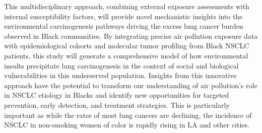 This multidisciplinary approach, combining external exposure assessments with internal susceptibility factors, 
will provide novel mechanistic insights into the environmental carcinogenesis pathways driving the excess lung cancer burden observed in Black communities. 
By integrating precise air pollution exposure data with epidemiological cohorts and molecular tumor profiling from Black NSCLC patients, 
this study will generate a comprehensive model of how environmental insults precipitate lung carcinogenesis 
in the context of social and biological vulnerabilities in this underserved population. 
Insights from this innovative approach have the potential to transform our understanding of air pollution's role in NSCLC etiology in Blacks 
and identify new opportunities for targeted prevention, early detection, and treatment strategies.
This is particularly important as while the rates of most lung cancers are declining, 
the incidence of NSCLC in non-smoking women of color is rapidly rising in LA and other cities.~\cite{x}

